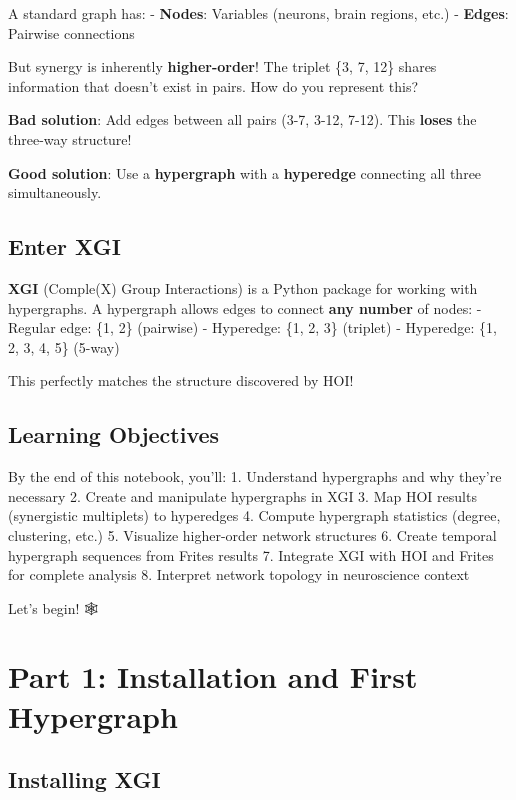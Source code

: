 \documentclass[
  11pt,
  letterpaper,
  oneside,
  openany]{book}
\begin{document}
A standard graph has: - \textbf{Nodes}: Variables (neurons, brain
regions, etc.) - \textbf{Edges}: Pairwise connections

But synergy is inherently \textbf{higher-order}! The triplet \{3, 7,
12\} shares information that doesn't exist in pairs. How do you
represent this?

\textbf{Bad solution}: Add edges between all pairs (3-7, 3-12, 7-12).
This \textbf{loses} the three-way structure!

\textbf{Good solution}: Use a \textbf{hypergraph} with a
\textbf{hyperedge} connecting all three simultaneously.

\subsection{Enter XGI}\label{enter-xgi}

\textbf{XGI} (Comple(X) Group Interactions) is a Python package for
working with hypergraphs. A hypergraph allows edges to connect
\textbf{any number} of nodes: - Regular edge: \{1, 2\} (pairwise) -
Hyperedge: \{1, 2, 3\} (triplet) - Hyperedge: \{1, 2, 3, 4, 5\} (5-way)

This perfectly matches the structure discovered by HOI!

\subsection{Learning Objectives}\label{learning-objectives-3}

By the end of this notebook, you'll: 1. Understand hypergraphs and why
they're necessary 2. Create and manipulate hypergraphs in XGI 3. Map HOI
results (synergistic multiplets) to hyperedges 4. Compute hypergraph
statistics (degree, clustering, etc.) 5. Visualize higher-order network
structures 6. Create temporal hypergraph sequences from Frites results
7. Integrate XGI with HOI and Frites for complete analysis 8. Interpret
network topology in neuroscience context

Let's begin! 🕸️

\section{Part 1: Installation and First
Hypergraph}\label{part-1-installation-and-first-hypergraph}

\subsection{Installing XGI}\label{installing-xgi}
\end{document}
